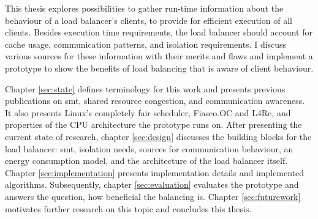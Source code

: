 This thesis explores possibilities to gather run-time information about the
behaviour of a load balancer's clients, to provide for efficient execution of
all clients.
Besides execution time requirements, the load balancer should account for cache usage,
communication patterns, and isolation requirements.
I discuss various sources for these information with their merits and flaws and
implement a prototype to show the benefits of load balancing that is aware of
client behaviour.

Chapter \ref{sec:state} defines terminology for this work and presents previous
publications on \gls{smt}, shared resource congestion, and communication awareness.
It also presents Linux's completely fair scheduler, Fiasco.OC and L4Re, and
properties of the CPU architecture the prototype runs on.
After presenting the current state of research, chapter \ref{sec:design} discusses
the building blocks for the load
balancer: \gls{smt}, isolation needs, sources for communication behaviour, an energy
consumption model, and the architecture of the load balancer itself.
Chapter \ref{sec:implementation} presents implementation details and
implemented algorithms.
Subsequently, chapter \ref{sec:evaluation} evaluates the prototype and answers
the question, how beneficial the balancing is.
Chapter \ref{sec:futurework} motivates further research on this topic and
concludes this thesis.


\cleardoublepage

